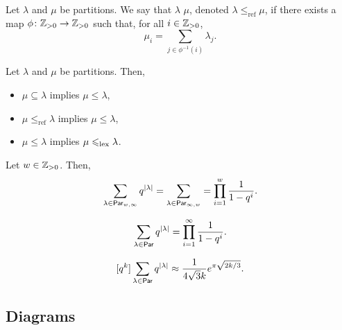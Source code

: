 \newcommand\refines{\leq_{\mathrm{ref}}}
\newcommand\lessref{<_{\mathrm{ref}}}

\begin{definition}
    Let \(\lambda\) and \(\mu\) be partitions.
    We say that \(\lambda\)  \(\mu\),
    denoted \(\lambda \refines \mu\),
    if there exists a map \(\phi \colon \mathbb{Z}_{> 0} \to \mathbb{Z}_{> 0}\) such that, for all \(i \in \mathbb{Z}_{> 0}\),
    \[
        \mu_i = \sum_{j \in \phi^{-1}(i)} \lambda_j.
    \]
\end{definition}

\begin{proposition}
    Let \(\lambda\) and \(\mu\) be partitions.
    Then,
    \begin{itemize}
        \item \(\mu \subseteq \lambda\) implies \(\mu \leq \lambda\),
        \item \(\mu \refines \lambda\) implies \(\mu \leq \lambda\),
        \item \(\mu \leq \lambda\) implies \(\mu \leqslant_{\mathrm{lex}} \lambda\).
    \end{itemize}
\end{proposition}

\begin{theorem}
    Let \(w \in \mathbb{Z}_{> 0}\).
    Then,
    \[
        \sum_{\lambda \in \operatorname{\mathsf{Par}}_{w, \infty}} q^{|\lambda|}
        = \sum_{\lambda \in \operatorname{\mathsf{Par}}_{\infty, w}}
        = \prod_{i=1}^{w} \frac{1}{1 - q^i}.
    \]
\end{theorem}

\begin{corollary}
    \[
        \sum_{\lambda \in \operatorname{\mathsf{Par}}} q^{|\lambda|}
        = \prod_{i=1}^{\infty} \frac{1}{1 - q^i}.
    \]
\end{corollary}

\begin{theorem}
    \[
        [q^k] \sum_{\lambda \in \operatorname{\mathsf{Par}}} q^{|\lambda|}
        \approx \frac{1}{4 \sqrt{3} k} e^{\pi \sqrt{2k/3}}.
    \]
\end{theorem}

\subsection{Diagrams} \label{subsec:diagrams}

